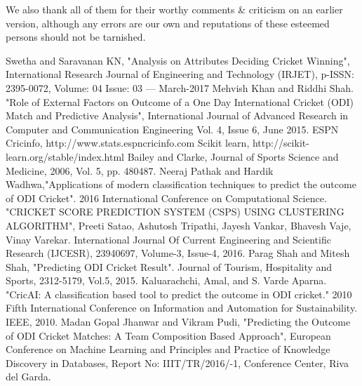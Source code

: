 \documentclass[a4paper, 10pt, conference]{IEEEtran}
\begin{document}
We also thank all of them for their worthy comments \& criticism on an earlier version, although any errors are our own and reputations of these esteemed persons should not be tarnished.



\begin{thebibliography}{99}

 Swetha and Saravanan KN, "Analysis on Attributes Deciding Cricket Winning", International Research Journal of Engineering and Technology (IRJET), p-ISSN: 2395-0072, Volume: 04 Issue: 03 — March-2017
 Mehvish Khan and Riddhi Shah. "Role of External Factors on Outcome of a One Day International Cricket (ODI) Match and Predictive Analysis", International Journal of Advanced Research in Computer and Communication Engineering Vol. 4, Issue 6, June 2015.
 ESPN Cricinfo, http://www.stats.espncricinfo.com
 Scikit learn, http://scikit-learn.org/stable/index.html
 Bailey and Clarke, Journal of Sports Science and Medicine, 2006, Vol. 5, pp. 480487.
 Neeraj Pathak and Hardik Wadhwa,"Applications of modern classification techniques to predict the outcome of ODI Cricket". 2016 International Conference on Computational Science.
 "CRICKET SCORE PREDICTION SYSTEM (CSPS) USING CLUSTERING ALGORITHM", Preeti Satao, Ashutosh Tripathi, Jayesh Vankar, Bhavesh Vaje, Vinay Varekar.  International Journal Of Current Engineering and Scientiﬁc Research (IJCESR), 23940697, Volume-3, Issue-4, 2016.
 Parag Shah and Mitesh Shah, "Predicting ODI Cricket Result". Journal of Tourism, Hospitality and Sports, 2312-5179, Vol.5, 2015.
 Kaluarachchi, Amal, and S. Varde Aparna. "CricAI: A classiﬁcation based tool to predict the outcome in ODI cricket." 2010 Fifth International Conference on Information and Automation for Sustainability. IEEE, 2010.
  Madan Gopal Jhanwar and Vikram Pudi, "Predicting the Outcome of ODI Cricket Matches: A Team Composition Based Approach", European Conference on Machine Learning and Principles and Practice of Knowledge Discovery in Databases, Report No: IIIT/TR/2016/-1, Conference Center, Riva del Garda.

\end{thebibliography}
\end{document}
